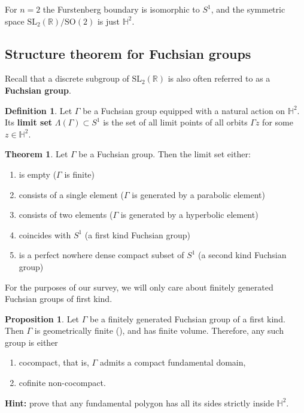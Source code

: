 \documentclass[11pt]{amsart}
\theoremstyle{definition}
\newtheorem{definition}{Definition}[section]
\newtheorem{theorem}{Theorem}[section]
\newtheorem{proposition}{Proposition}[section]
\begin{document}
		For $n = 2$ the Furstenberg boundary is isomorphic to $S^1$, and the symmetric space $\text{SL}_2(\mathbb{R}) / \text{SO}(2)$ is just $\mathbb{H}^2$.
		
		\subsection{Structure theorem for Fuchsian groups}
		Recall that a discrete subgroup of $\text{SL}_2(\mathbb{R})$ is also often referred to as a \textbf{Fuchsian group}.
		
		\begin{definition}
			Let $\Gamma$ be a Fuchsian group equipped with a natural action on $\mathbb{H}^2$. Its \textbf{limit set} $\Lambda(\Gamma) \subset S^1$ is the set of all limit points of all orbits $\Gamma z$ for some $z \in \mathbb{H}^2$. 
		\end{definition}
		\begin{theorem}
			\label{classification of Fuchsian}
			Let $\Gamma$ be a Fuchsian group. Then the limit set either:
			\begin{enumerate}
				\item is empty ($\Gamma$ is finite)
				\item consists of a single element ($\Gamma$ is generated by a parabolic element)
				\item consists of two elements ($\Gamma$ is generated by a hyperbolic element)
				\item coincides with $S^1$ (a first kind Fuchsian group)
				\item is a perfect nowhere dense compact subset of $S^1$ (a second kind Fuchsian group) 
			\end{enumerate}
		\end{theorem}
		
		For the purposes of our survey, we will only care about finitely generated Fuchsian groups of first kind.
		
		
		\begin{proposition}
			\label{classification of first kind}
			Let $\Gamma$ be a finitely generated Fuchsian group of a first kind. Then $\Gamma$ is geometrically finite (\cite[Theorem 4.6.1]{book:291162}), and has finite volume. Therefore, any such group is either
			\begin{enumerate}
				\item cocompact, that is, $\Gamma$ admits a compact fundamental domain,
				\item cofinite non-cocompact.
			\end{enumerate} 
		\end{proposition}
		\textbf{Hint:} prove that any fundamental polygon has all its sides strictly inside $\mathbb{H}^2$.
			
\end{document}
